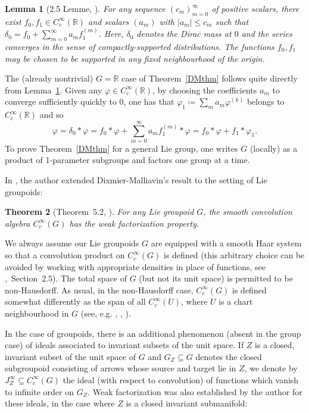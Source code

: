 \documentclass[12pt]{article}
\theoremstyle{plain}
\newtheorem{thm}{Theorem}[section]
\newtheorem{lemma}[thm]{Lemma}
\theoremstyle{definition}
\newcommand{\R}{\mathbb{R}}
\numberwithin{equation}{section}
\begin{document}
\begin{lemma}[2.5 Lemme, \cite{Dixmier-Malliavin}]\label{DMlemma}
For any sequence $(c_m)_{m=0}^\infty$ of positive scalars, there exist $f_0,f_1 \in C_c^\infty(\R)$ and scalars $(a_m)$ with $|a_m| \leq c_m$ such that $\delta_0 = f_0 +  \sum_{m=0}^\infty a_m f_1^{(m)}$. Here,  $\delta_0$ denotes the Dirac mass at $0$ and the series converges in the sense  of compactly-supported distributions. The functions $f_0, f_1$ may be chosen to be supported in any fixed neighbourhood of the origin.
\end{lemma}
The (already nontrivial) $G=\R$ case of Theorem~\ref{DMthm} follows quite directly from Lemma~\ref{DMlemma}. Given any $\varphi \in C_c^\infty(\R)$, by choosing the coefficients $a_m$  to converge sufficiently quickly to $0$, one has that $\varphi_1 \coloneqq \sum_m a_m \varphi^{(k)}$ belongs to $C_c^\infty(\R)$ and so
\[ \varphi  = \delta_0 * \varphi =  f_0 * \varphi + \sum_{m=0}^\infty a_m f_1^{(m)} * \varphi =  f_0 * \varphi + f_1 *  \varphi_1. \]
To prove Theorem~\ref{DMthm} for a general Lie group, one writes $G$ (locally) as a product of 1-parameter subgroups and factors one group at a time. 


In \cite{Francis[DM]}, the author extended Dixmier-Malliavin's result to the setting of Lie groupoids:

\begin{thm}[Theorem~5.2, \cite{Francis[DM]}]\label{DMprev}
For any Lie groupoid $G$, the smooth convolution algebra $C_c^\infty(G)$  has the weak factorization property.
\end{thm}



We always assume our Lie groupoids $G$ are equipped with a smooth Haar system so that a convolution product on  $C_c^\infty(G)$ is defined (this arbitrary choice can be avoided by working with appropriate densities in place of functions, see \cite{Connes[BOOK]},~Section~2.5). The total space of $G$ (but not its unit space) is permitted to be non-Hausdorff. As usual, in the non-Hausdorff case, $C_c^\infty(G)$ is defined somewhat differently as the span of all $C_c^\infty(U)$, where $U$ is a chart neighbourhood in $G$ (see, e.g. \cite{Connes[BOOK]}, \cite{Connes[1978]}, \cite{Khoshkam-Skandalis[2004]}).
 

In the case of groupoids, there is an additional phenomenon (absent in the group case) of ideals associated to invariant subsets of the unit space. If $Z$ is a closed, invariant subset of the unit space of $G$ and $G_Z \subseteq G$ denotes the closed subgroupoid consisting of arrows  whose source and target lie in $Z$, we denote by  $J_Z^\infty \subseteq C_c^\infty(G)$ the ideal (with respect to convolution) of functions which vanish to infinite order on $G_Z$. Weak factorization was also established by the author for these ideals, in the case where $Z$ is a closed invariant submanifold:
\end{document}
